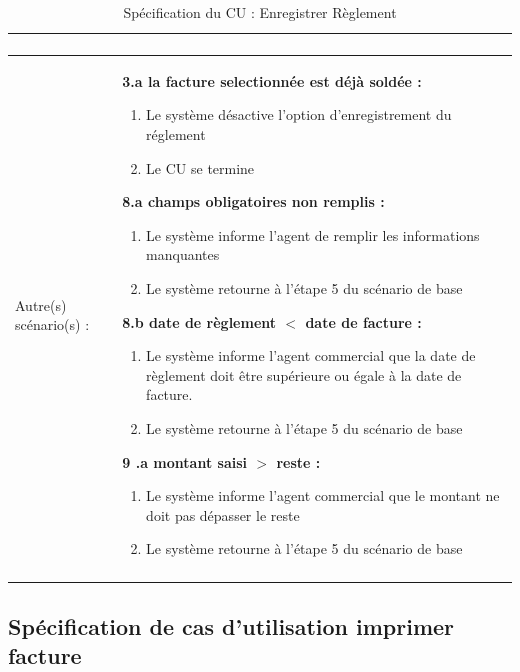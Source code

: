 \begin{longtable}{|>{\bfseries\raggedright\arraybackslash}p{3.5cm}|p{\dimexpr\textwidth-3.5cm-4\tabcolsep-2\arrayrulewidth}|}
\begin{enumerate}[leftmargin=1.5em, topsep=2pt, itemsep=1pt]
\end{enumerate} \\
\hline
Autre(s) scénario(s) : &
\textbf{3.a la facture selectionnée est déjà soldée :}
\begin{enumerate}[leftmargin=1.5em, topsep=2pt, itemsep=1pt]
  \item Le système désactive l'option d'enregistrement du réglement
  \item Le CU se termine
\end{enumerate}
\textbf{8.a champs obligatoires non remplis :}
\begin{enumerate}[leftmargin=1.5em, topsep=2pt, itemsep=1pt]
  \item Le système informe l'agent de remplir les informations manquantes
  \item Le système retourne à l'étape 5 du scénario de base
\end{enumerate}
\textbf{8.b date de règlement $<$ date de facture :}
\begin{enumerate}[leftmargin=1.5em, topsep=2pt, itemsep=1pt]
  \item Le système informe l'agent commercial que la date de règlement doit être supérieure ou égale à la date de facture.
  \item Le système retourne à l'étape 5 du scénario de base
\end{enumerate}
\textbf{9 .a montant saisi $>$ reste :}
\begin{enumerate}[leftmargin=1.5em, topsep=2pt, itemsep=1pt]
  \item Le système informe l'agent commercial que le montant ne doit pas dépasser le reste
  \item Le système retourne à l'étape 5 du scénario de base
\end{enumerate} \\
\hline
\caption{Spécification du CU : Enregistrer Règlement}
\label{tab:cu-enregistrer-reglement}
\end{longtable}

\newpage
{}
\subsection{Spécification de cas d'utilisation imprimer facture}

